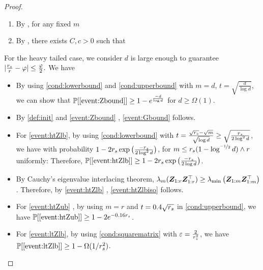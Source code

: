 \begin{proof}
\begin{enumerate}[label=(S.\arabic*), leftmargin=*]
\item  \label{cond:upperbound}	By \cite[Corollary 5.35]{vershynin2010introduction},  for any fixed $m$  
\item  \label{cond:squarematrix} By \cite[Theorem 5.38]{vershynin2010introduction}, there exists $C, c > 0$ such that
\end{enumerate}
For the heavy tailed case,  we  consider $d$ is large enough to guarantee  $\lvert\tfrac{r_s}{r} - \varphi\rvert \leq \frac{\varphi}{2}.$ We have
\begin{itemize}[leftmargin=*]
\item  By using \ref{cond:lowerbound} and \ref{cond:upperbound} with $m = d$,  $t = \sqrt{ \tfrac{d}{\log d} }$, we can show that $\mathbb{P}[  \ref{event:Zbound} ] \geq 1 - e^{ \frac{ - d}{\log d}}$ for $d \geq \Omega(1)$.
 \item By   \eqref{def:init} and   \ref{event:Zbound} ,    \ref{event:Gbound}  follows.
 \item For   \ref{event:htZlb}, by using \ref{cond:lowerbound} with $t = \frac{\sqrt{r_s} - \sqrt{m}}{\sqrt{\log d}} \geq  \sqrt{  \tfrac{r_s }{2 \log^2 d} }$, we have with probability $1 - 2 r_s \exp \big( \tfrac{- r_s}{2 \log^2  d} \big)$,   for $m \leq r_s (1 -   \log^{\nicefrac{-1}{2}} d) \wedge r$ uniformly:
Therefore,   $\mathbb{P}[  \ref{event:htZlb} ] \geq 1 - 2 r_s \exp \big( \tfrac{- r_s}{2 \log  d} \big)$.
\item By Cauchy's eigenvalue interlacing theorem,   $\lambda_{m}(    \boldsymbol{Z}_{1:r} \boldsymbol{Z}_{1:r}^\top ) \geq  \lambda_{\mathrm{min}} \left(  \boldsymbol{Z}_{1:m} \boldsymbol{Z}_{1:m}^\top  \right)$. Therefore, by  \ref{event:htZlb} ,  \ref{event:htZlbiso} follows. 
\item For \ref{event:htZub} , by using $m = r$ and $t = 0.4 \sqrt{r_s}$ in   \ref{cond:upperbound}, we have 	 $\mathbb{P}[  \ref{event:htZub}  ] \geq 1 - 2 e^{- 0.16 r_s}$.
\item  For   \ref{event:ltZlb}, by using \ref{cond:squarematrix} with $\varepsilon = \frac{2}{r_s^2}$,  we have  $\mathbb{P}  [   \ref{event:ltZlb} ] \geq 1 - \Omega(1/r_s^2)$.

\end{itemize}
\end{proof}
